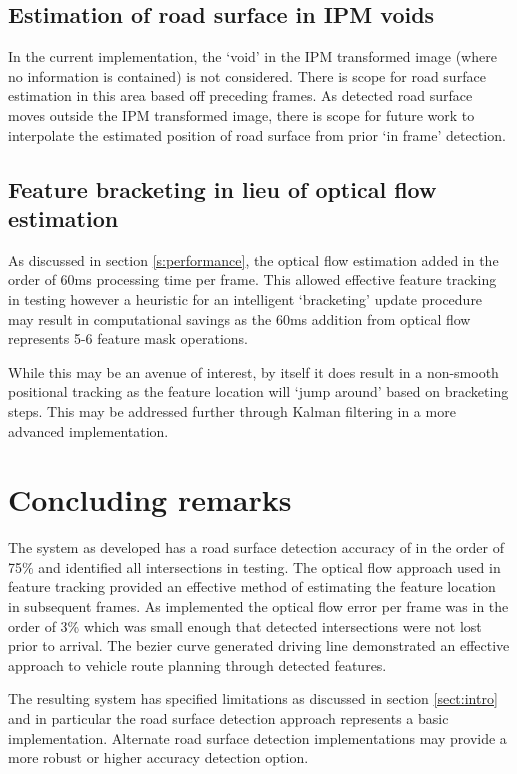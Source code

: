 \documentclass[]{aiaa-tc}%
\begin{document}
\subsection{Estimation of road surface in IPM voids}

In the current implementation, the `void' in the IPM transformed image (where no information is contained) is not considered. There is scope for road surface estimation in this area based off preceding frames. As detected road surface moves outside the IPM transformed image, there is scope for future work to interpolate the estimated position of road surface from prior `in frame' detection.

\subsection{Feature bracketing in lieu of optical flow estimation}

As discussed in section \ref{s:performance}, the optical flow estimation added in the order of 60ms processing time per frame. This allowed effective feature tracking in testing however a heuristic for an intelligent `bracketing' update procedure may result in computational savings as the 60ms addition from optical flow represents 5-6 feature mask operations.

While this may be an avenue of interest, by itself it does result in a non-smooth positional tracking as the feature location will `jump around' based on bracketing steps. This may be addressed further through Kalman filtering in a more advanced implementation.


\section{Concluding remarks}

The system as developed has a road surface detection accuracy of in the order of 75\% and identified all intersections in testing. The optical flow approach used in feature tracking provided an effective method of estimating the feature location in subsequent frames. As implemented the optical flow error per frame was in the order of 3\% which was small enough that detected intersections were not lost prior to arrival. The bezier curve generated driving line demonstrated an effective approach to vehicle route planning through detected features.

The resulting system has specified limitations as discussed in section \ref{sect:intro} and in particular the road surface detection approach represents a basic implementation. Alternate road surface detection implementations may provide a more robust or higher accuracy detection option.
\end{document}
